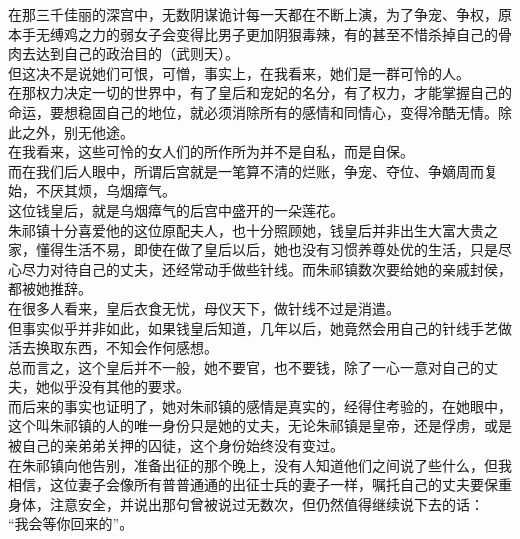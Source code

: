 \begin{multicols}{\theparacolNo}
在那三千佳丽的深宫中，无数阴谋诡计每一天都在不断上演，为了争宠、争权，原本手无缚鸡之力的弱女子会变得比男子更加阴狠毒辣，有的甚至不惜杀掉自己的骨肉去达到自己的政治目的（武则天）。\\

但这决不是说她们可恨，可憎，事实上，在我看来，她们是一群可怜的人。\\

在那权力决定一切的世界中，有了皇后和宠妃的名分，有了权力，才能掌握自己的命运，要想稳固自己的地位，就必须消除所有的感情和同情心，变得冷酷无情。除此之外，别无他途。\\

在我看来，这些可怜的女人们的所作所为并不是自私，而是自保。\\

而在我们后人眼中，所谓后宫就是一笔算不清的烂账，争宠、夺位、争嫡周而复始，不厌其烦，乌烟瘴气。\\

这位钱皇后，就是乌烟瘴气的后宫中盛开的一朵莲花。\\

朱祁镇十分喜爱他的这位原配夫人，也十分照顾她，钱皇后并非出生大富大贵之家，懂得生活不易，即使在做了皇后以后，她也没有习惯养尊处优的生活，只是尽心尽力对待自己的丈夫，还经常动手做些针线。而朱祁镇数次要给她的亲戚封侯，都被她推辞。\\

在很多人看来，皇后衣食无忧，母仪天下，做针线不过是消遣。\\

但事实似乎并非如此，如果钱皇后知道，几年以后，她竟然会用自己的针线手艺做活去换取东西，不知会作何感想。\\

总而言之，这个皇后并不一般，她不要官，也不要钱，除了一心一意对自己的丈夫，她似乎没有其他的要求。\\

而后来的事实也证明了，她对朱祁镇的感情是真实的，经得住考验的，在她眼中，这个叫朱祁镇的人的唯一身份只是她的丈夫，无论朱祁镇是皇帝，还是俘虏，或是被自己的亲弟弟关押的囚徒，这个身份始终没有变过。\\

在朱祁镇向他告别，准备出征的那个晚上，没有人知道他们之间说了些什么，但我相信，这位妻子会像所有普普通通的出征士兵的妻子一样，嘱托自己的丈夫要保重身体，注意安全，并说出那句曾被说过无数次，但仍然值得继续说下去的话：\\

“我会等你回来的”。\\


\end{multicols}
